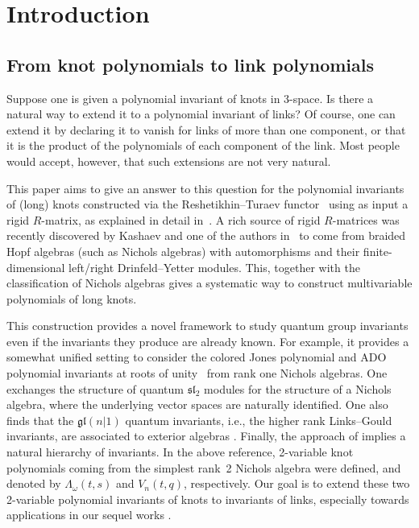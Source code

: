 \documentclass[pdftex]{sigma}
\numberwithin{equation}{section}
\theoremstyle{definition}
\begin{document}


\section{Introduction}
\label{sec:intro}

\subsection{From knot polynomials to link polynomials}
Suppose one is given a polynomial invariant of knots in 3-space. Is there a
natural way to extend it to a polynomial invariant of links? Of course, one
can extend it by declaring it to vanish for links of more than one component,
or that it is the product of the polynomials of each component of the link.
Most people would accept, however, that such extensions are not very natural.

This paper aims to give an answer to this question for the polynomial invariants
of (long) knots constructed via the Reshetikhin--Turaev functor~\cite{RT}
using as input a rigid $R$-matrix, as explained in detail in~\cite{Kas1}.
A rich source of rigid $R$-matrices was recently discovered by Kashaev and one
of the authors in~\cite{GK:multi} to come from braided Hopf algebras (such as Nichols
algebras) with automorphisms and their finite-dimensional left/right
Drinfeld--Yetter modules. This, together with the classification of Nichols algebras
gives a systematic way to construct multivariable polynomials of long knots.

This construction provides a novel framework to study quantum group invariants even if the invariants they produce are already known. For example, it provides a somewhat unified setting to consider the colored Jones polynomial and ADO polynomial invariants at roots of unity~\cite{ADO} from rank one Nichols algebras. One exchanges the structure of quantum $\mathfrak{sl}_2$ modules for the structure of a Nichols algebra, where the underlying vector spaces are naturally identified.
One also finds that the $\mathfrak{gl}(n|1)$ quantum invariants, i.e., the higher rank Links--Gould invariants, are associated to exterior algebras \cite{Kas3}.
Finally, the approach of \cite{GK:multi} implies a natural hierarchy of invariants. In the above reference,
2-variable knot polynomials coming from the simplest rank~2 Nichols algebra were
defined, and denoted by $\Lambda_\omega(t,s)$ and $V_n(t,q)$, respectively. Our goal is to extend these two 2-variable polynomial invariants of knots to invariants of links, especially towards applications in our sequel works \cite{GHKKST, GHKKW}.
\end{document}

